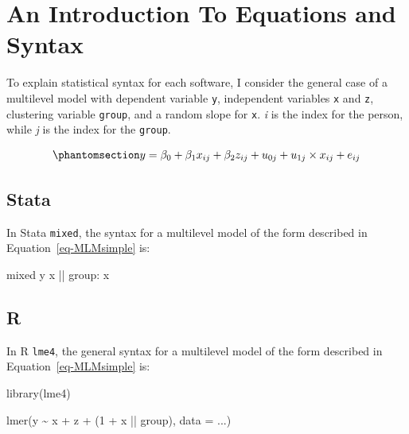 \documentclass[
  letterpaper,
  DIV=11,
  numbers=noendperiod]{scrreprt}
\newenvironment{Shaded}{\begin{snugshade}}{\end{snugshade}}
\newcommand{\AttributeTok}[1]{\textcolor[rgb]{0.40,0.45,0.13}{#1}}
\newcommand{\DecValTok}[1]{\textcolor[rgb]{0.68,0.00,0.00}{#1}}
\newcommand{\FunctionTok}[1]{\textcolor[rgb]{0.28,0.35,0.67}{#1}}
\newcommand{\NormalTok}[1]{\textcolor[rgb]{0.00,0.23,0.31}{#1}}
\newcommand{\SpecialCharTok}[1]{\textcolor[rgb]{0.37,0.37,0.37}{#1}}
\begin{document}
\section{An Introduction To Equations and Syntax}\label{sec-syntax}

To explain statistical syntax for each software, I consider the general
case of a multilevel model with dependent variable \texttt{y},
independent variables \texttt{x} and \texttt{z}, clustering variable
\texttt{group}, and a random slope for \texttt{x}. \emph{i} is the index
for the person, while \emph{j} is the index for the \texttt{group}.

\begin{equation}\phantomsection\label{eq-MLMsimple}{y = \beta_0 + \beta_1 x_{ij} + \beta_2 z_{ij} + u_{0j} + u_{1j} \times x_{ij} + e_{ij}}\end{equation}

\subsection{Stata}

In Stata \texttt{mixed}, the syntax for a multilevel model of the form
described in Equation~\ref{eq-MLMsimple} is:

\begin{Shaded}
\begin{Highlighting}[]
\NormalTok{mixed }\FunctionTok{y}\NormalTok{ x || }\FunctionTok{group}\NormalTok{: x}
\end{Highlighting}
\end{Shaded}

\subsection{R}

In R \texttt{lme4}, the general syntax for a multilevel model of the
form described in Equation~\ref{eq-MLMsimple} is:

\begin{Shaded}
\begin{Highlighting}[]
\FunctionTok{library}\NormalTok{(lme4)}

\FunctionTok{lmer}\NormalTok{(y }\SpecialCharTok{\textasciitilde{}}\NormalTok{ x }\SpecialCharTok{+}\NormalTok{ z }\SpecialCharTok{+}\NormalTok{ (}\DecValTok{1} \SpecialCharTok{+}\NormalTok{ x }\SpecialCharTok{||}\NormalTok{ group), }\AttributeTok{data =}\NormalTok{ ...)}
\end{Highlighting}
\end{Shaded}
\end{document}
